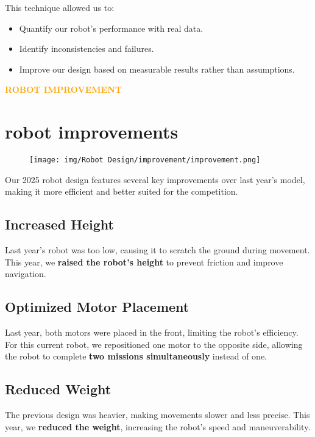 This technique allowed us to:
\begin{itemize}
    \item Quantify our robot's performance with real data.
    \item Identify inconsistencies and failures.
    \item Improve our design based on measurable results rather than assumptions.
    
\end{itemize}


\newpage
\begin{center}
    \huge \textbf{\textcolor{orange}{ROBOT IMPROVEMENT}} \\[0.5cm]
\end{center}
\section{robot improvements}
\vspace{0.5cm}
\begin{figure}[h!]
    \centering
    \texttt{[image: img/Robot Design/improvement/improvement.png]}
\end{figure}

Our 2025 robot design features several key improvements over last year's model, making it more efficient and better suited for the competition. 

\subsection{Increased Height}
Last year’s robot was too low, causing it to scratch the ground during movement. This year, we \textbf{raised the robot’s height} to prevent friction and improve navigation.

\subsection{Optimized Motor Placement}
Last year, both motors were placed in the front, limiting the robot’s efficiency. For this current robot, we repositioned one motor to the opposite side, allowing the robot to complete \textbf{two missions simultaneously} instead of one.

\subsection{Reduced Weight}
The previous design was heavier, making movements slower and less precise. This year, we \textbf{reduced the weight}, increasing the robot’s speed and maneuverability.

